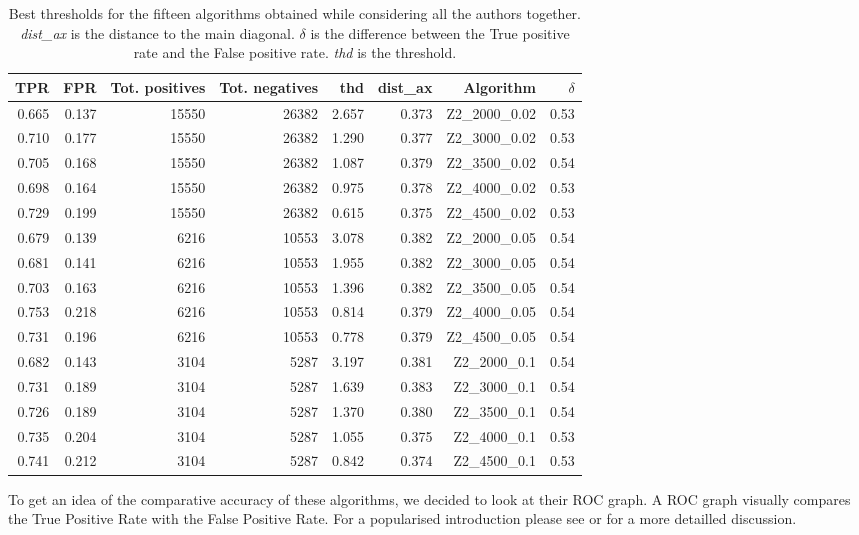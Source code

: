 \documentclass{article}\usepackage[]{graphicx}\usepackage[]{color}
\begin{document}
\begin{table}
\centering
\begin{tabular}{r|r|r|r|r|r|r|r}
TPR & FPR & Tot. positives & Tot. negatives & thd & dist{\_ax} & Algorithm & $\delta$ \\
  \hline
0.665 & 0.137 & 15550 & 26382 & 2.657 & 0.373 & Z2\_2000\_0.02 & 0.53 \\ 
  0.710 & 0.177 & 15550 & 26382 & 1.290 & 0.377 & Z2\_3000\_0.02 & 0.53 \\ 
  0.705 & 0.168 & 15550 & 26382 & 1.087 & 0.379 & Z2\_3500\_0.02 & 0.54 \\ 
  0.698 & 0.164 & 15550 & 26382 & 0.975 & 0.378 & Z2\_4000\_0.02 & 0.53 \\ 
  0.729 & 0.199 & 15550 & 26382 & 0.615 & 0.375 & Z2\_4500\_0.02 & 0.53 \\ 
  0.679 & 0.139 & 6216 & 10553 & 3.078 & 0.382 & Z2\_2000\_0.05 & 0.54 \\ 
  0.681 & 0.141 & 6216 & 10553 & 1.955 & 0.382 & Z2\_3000\_0.05 & 0.54 \\ 
  0.703 & 0.163 & 6216 & 10553 & 1.396 & 0.382 & Z2\_3500\_0.05 & 0.54 \\ 
  0.753 & 0.218 & 6216 & 10553 & 0.814 & 0.379 & Z2\_4000\_0.05 & 0.54 \\ 
  0.731 & 0.196 & 6216 & 10553 & 0.778 & 0.379 & Z2\_4500\_0.05 & 0.54 \\ 
  0.682 & 0.143 & 3104 & 5287 & 3.197 & 0.381 & Z2\_2000\_0.1 & 0.54 \\ 
  0.731 & 0.189 & 3104 & 5287 & 1.639 & 0.383 & Z2\_3000\_0.1 & 0.54 \\ 
  0.726 & 0.189 & 3104 & 5287 & 1.370 & 0.380 & Z2\_3500\_0.1 & 0.54 \\ 
  0.735 & 0.204 & 3104 & 5287 & 1.055 & 0.375 & Z2\_4000\_0.1 & 0.53 \\ 
  0.741 & 0.212 & 3104 & 5287 & 0.842 & 0.374 & Z2\_4500\_0.1 & 0.53 \\ 
   \hline

\end{tabular}
\caption{Best thresholds for the fifteen algorithms obtained while considering all the authors together. {\it dist{\_}ax} is the distance to the main diagonal. $\delta$ is the difference between the True positive rate and the False positive rate. {\it thd} is the threshold.}
\label{tab:tablebestall}
\end{table}
To get an idea of the comparative accuracy of these algorithms, we decided to look at their ROC graph. A ROC graph visually compares the True Positive Rate with the False Positive Rate. For a popularised introduction please see \autocite{Swets2008} or \autocite{Fawcett2006} for a more detailled discussion.
\end{document}
